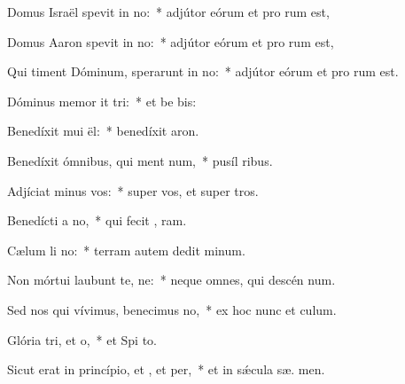 \item Domus Israël spevit in no:~* adjútor eórum et pro rum est,
\item Domus Aaron spevit in no:~* adjútor eórum et pro rum est,
\item Qui timent Dóminum, sperarunt in no:~* adjútor eórum et pro rum est.
\item Dóminus memor it tri:~* et be bis:
\item Benedíxit mui ël:~* benedíxit  aron.
\item Benedíxit ómnibus, qui ment num,~* pusíl  ribus.
\item Adjíciat minus  vos:~* super vos, et super  tros.
\item Benedícti  a no,~* qui fecit ,  ram.
\item Cælum li no:~* terram autem dedit  minum.
\item Non mórtui laubunt te, ne:~* neque omnes, qui descén  num.
\item Sed nos qui vívimus, benecimus no,~* ex hoc nunc et   culum.
\item Glória tri, et o,~* et Spi to.
\item Sicut erat in princípio, et , et per,~* et in sǽcula sæ. men.
